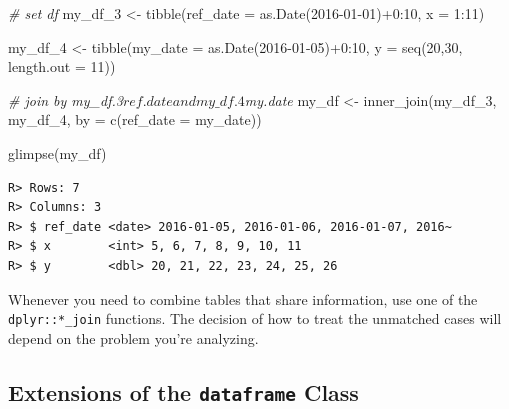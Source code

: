 \documentclass[
  12pt,
]{book}
\newenvironment{Shaded}{\begin{snugshade}}{\end{snugshade}}
\newcommand{\AttributeTok}[1]{\textcolor[rgb]{0.61,0.61,0.61}{#1}}
\newcommand{\CommentTok}[1]{\textcolor[rgb]{0.37,0.37,0.37}{\textit{#1}}}
\newcommand{\DecValTok}[1]{\textcolor[rgb]{0.06,0.06,0.06}{#1}}
\newcommand{\FunctionTok}[1]{\textcolor[rgb]{0,0,0}{#1}}
\newcommand{\NormalTok}[1]{#1}
\newcommand{\OtherTok}[1]{\textcolor[rgb]{0.37,0.37,0.37}{#1}}
\newcommand{\SpecialCharTok}[1]{\textcolor[rgb]{0,0,0}{#1}}
\newcommand{\StringTok}[1]{\textcolor[rgb]{0.5,0.5,0.5}{#1}}
\begin{document}
\begin{Shaded}
\begin{Highlighting}[]
\CommentTok{\# set df}
\NormalTok{my\_df\_3 }\OtherTok{\textless{}{-}} \FunctionTok{tibble}\NormalTok{(}\AttributeTok{ref\_date =} \FunctionTok{as.Date}\NormalTok{(}\StringTok{\textquotesingle{}2016{-}01{-}01\textquotesingle{}}\NormalTok{)}\SpecialCharTok{+}\DecValTok{0}\SpecialCharTok{:}\DecValTok{10}\NormalTok{,}
                  \AttributeTok{x =} \DecValTok{1}\SpecialCharTok{:}\DecValTok{11}\NormalTok{)}

\NormalTok{my\_df\_4 }\OtherTok{\textless{}{-}} \FunctionTok{tibble}\NormalTok{(}\AttributeTok{my\_date =} \FunctionTok{as.Date}\NormalTok{(}\StringTok{\textquotesingle{}2016{-}01{-}05\textquotesingle{}}\NormalTok{)}\SpecialCharTok{+}\DecValTok{0}\SpecialCharTok{:}\DecValTok{10}\NormalTok{,}
                  \AttributeTok{y =} \FunctionTok{seq}\NormalTok{(}\DecValTok{20}\NormalTok{,}\DecValTok{30}\NormalTok{, }\AttributeTok{length.out =} \DecValTok{11}\NormalTok{))}

\CommentTok{\# join by my\_df.3$ref.date and my\_df.4$my.date}
\NormalTok{my\_df }\OtherTok{\textless{}{-}} \FunctionTok{inner\_join}\NormalTok{(my\_df\_3, my\_df\_4,}
                    \AttributeTok{by =} \FunctionTok{c}\NormalTok{(}\StringTok{\textquotesingle{}ref\_date\textquotesingle{}} \OtherTok{=} \StringTok{\textquotesingle{}my\_date\textquotesingle{}}\NormalTok{))}

\FunctionTok{glimpse}\NormalTok{(my\_df)}
\end{Highlighting}
\end{Shaded}

\begin{verbatim}
R> Rows: 7
R> Columns: 3
R> $ ref_date <date> 2016-01-05, 2016-01-06, 2016-01-07, 2016~
R> $ x        <int> 5, 6, 7, 8, 9, 10, 11
R> $ y        <dbl> 20, 21, 22, 23, 24, 25, 26
\end{verbatim}

Whenever you need to combine tables that share information, use one of the \texttt{dplyr::*\_join} functions. The decision of how to treat the unmatched cases will depend on the problem you're analyzing.

\hypertarget{extensions-of-the-dataframe-class}{%
\subsection{\texorpdfstring{Extensions of the \texttt{dataframe} Class}{Extensions of the dataframe Class}}\label{extensions-of-the-dataframe-class}}
\end{document}
